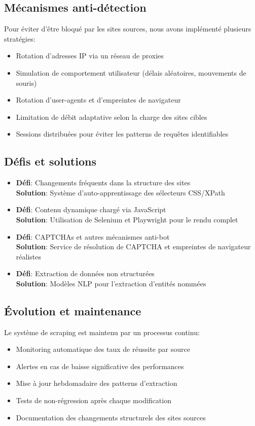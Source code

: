 \documentclass[10pt,a4paper,twocolumn]{article}
\begin{document}
\subsection{Mécanismes anti-détection}
Pour éviter d'être bloqué par les sites sources, nous avons implémenté plusieurs stratégies:
\begin{itemize}
    \item Rotation d'adresses IP via un réseau de proxies
    \item Simulation de comportement utilisateur (délais aléatoires, mouvements de souris)
    \item Rotation d'user-agents et d'empreintes de navigateur
    \item Limitation de débit adaptative selon la charge des sites cibles
    \item Sessions distribuées pour éviter les patterns de requêtes identifiables
\end{itemize}

\subsection{Défis et solutions}
\begin{itemize}
    \item \textbf{Défi}: Changements fréquents dans la structure des sites\\
    \textbf{Solution}: Système d'auto-apprentissage des sélecteurs CSS/XPath

    \item \textbf{Défi}: Contenu dynamique chargé via JavaScript\\
    \textbf{Solution}: Utilisation de Selenium et Playwright pour le rendu complet

    \item \textbf{Défi}: CAPTCHAs et autres mécanismes anti-bot\\
    \textbf{Solution}: Service de résolution de CAPTCHA et empreintes de navigateur réalistes

    \item \textbf{Défi}: Extraction de données non structurées\\
    \textbf{Solution}: Modèles NLP pour l'extraction d'entités nommées
\end{itemize}

\subsection{Évolution et maintenance}
Le système de scraping est maintenu par un processus continu:
\begin{itemize}
    \item Monitoring automatique des taux de réussite par source
    \item Alertes en cas de baisse significative des performances
    \item Mise à jour hebdomadaire des patterns d'extraction
    \item Tests de non-régression après chaque modification
    \item Documentation des changements structurels des sites sources
\end{itemize}
\end{document}
